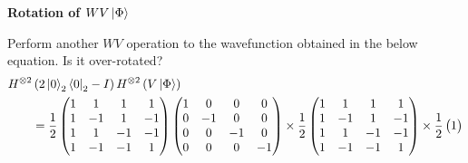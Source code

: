 \documentclass[a4paper, 10pt]{article}
\begin{document}
\begin{problem}
\textbf{Rotation of \( WV\ket{\Phi} \)}
\par Perform another \( WV \) operation to the wavefunction obtained in the below equation.
Is it over-rotated?
\begin{align*}
	H^{\otimes 2} & \left( 2\ket{0}_2\bra{0}_2 - I \right) H^{\otimes 2} \left( V\ket{\Phi} \right)                                        \\
	              & = \frac{1}{2} \begin{pmatrix}
		                              1 & 1  & 1  & 1  \\
		                              1 & -1 & 1  & -1 \\
		                              1 & 1  & -1 & -1 \\
		                              1 & -1 & -1 & 1
	                              \end{pmatrix} \begin{pmatrix}
		                                            1 & 0  & 0  & 0  \\
		                                            0 & -1 & 0  & 0  \\
		                                            0 & 0  & -1 & 0  \\
		                                            0 & 0  & 0  & -1
	                                            \end{pmatrix} \times \frac{1}{2} \begin{pmatrix}
		                                                                             1 & 1  & 1  & 1  \\
		                                                                             1 & -1 & 1  & -1 \\
		                                                                             1 & 1  & -1 & -1 \\
		                                                                             1 & -1 & -1 & 1
	                                                                             \end{pmatrix} \times \frac{1}{2} \begin{pmatrix}
		                                                                                                              1  \\

\end{pmatrix}
\end{align*}
\end{problem}
\end{document}
